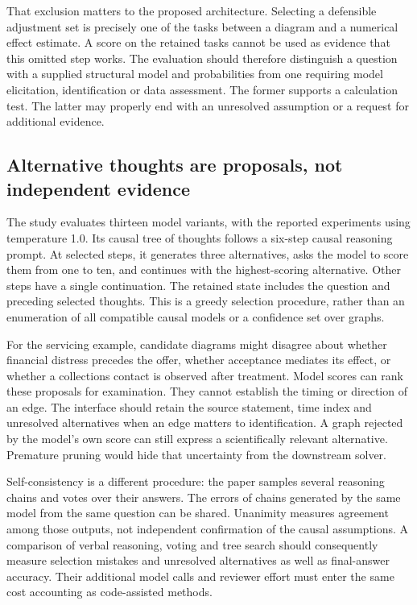That exclusion matters to the proposed architecture. Selecting a defensible
adjustment set is precisely one of the tasks between a diagram and a numerical
effect estimate. A score on the retained tasks cannot be used as evidence that
this omitted step works. The evaluation should therefore distinguish a
question with a supplied structural model and probabilities from one requiring
model elicitation, identification or data assessment. The former supports a
calculation test. The latter may properly end with an unresolved assumption or
a request for additional evidence.

\subsection{Alternative thoughts are proposals, not independent evidence}
\label{exec21:prophets-search}
The study evaluates thirteen model variants, with the reported experiments
using temperature 1.0. Its causal tree of thoughts follows a six-step causal
reasoning prompt. At selected steps, it generates three alternatives, asks the
model to score them from one to ten, and continues with the highest-scoring
alternative. Other steps have a single continuation. The retained state includes
the question and preceding selected thoughts. This is a greedy selection
procedure, rather than an enumeration of all compatible causal models or a
confidence set over graphs.~\citep{exec21_prophets}

For the servicing example, candidate diagrams might disagree about whether
financial distress precedes the offer, whether acceptance mediates its effect,
or whether a collections contact is observed after treatment. Model scores can
rank these proposals for examination. They cannot establish the timing or
direction of an edge. The interface should retain the source statement,
time index and unresolved alternatives when an edge matters to identification.
A graph rejected by the model's own score can still express a scientifically
relevant alternative. Premature pruning would hide that uncertainty from the
downstream solver.

Self-consistency is a different procedure: the paper samples several reasoning
chains and votes over their answers. The errors of chains generated by the same
model from the same question can be shared. Unanimity measures agreement among
those outputs, not independent confirmation of the causal assumptions. A
comparison of verbal reasoning, voting and tree search should consequently
measure selection mistakes and unresolved alternatives as well as final-answer
accuracy. Their additional model calls and reviewer effort must enter the same
cost accounting as code-assisted methods.~\citep{exec21_prophets}

